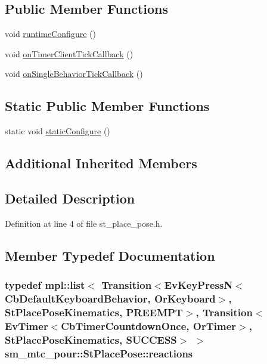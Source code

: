 \subsection*{Public Member Functions}
\begin{DoxyCompactItemize}
\item 
void \hyperlink{structsm__mtc__pour_1_1StPlacePose_a078643c61a6b7b4db7cf33a2aae4e0fa}{runtime\+Configure} ()
\item 
void \hyperlink{structsm__mtc__pour_1_1StPlacePose_a0ee8b552912408e648c7aba13c02cc94}{on\+Timer\+Client\+Tick\+Callback} ()
\item 
void \hyperlink{structsm__mtc__pour_1_1StPlacePose_a729c53fe332ca80613dc13659ba066be}{on\+Single\+Behavior\+Tick\+Callback} ()
\end{DoxyCompactItemize}
\subsection*{Static Public Member Functions}
\begin{DoxyCompactItemize}
\item 
static void \hyperlink{structsm__mtc__pour_1_1StPlacePose_a1973e99e9cd8b7d79e1a0f2800640aa5}{static\+Configure} ()
\end{DoxyCompactItemize}
\subsection*{Additional Inherited Members}


\subsection{Detailed Description}


Definition at line 4 of file st\+\_\+place\+\_\+pose.\+h.



\subsection{Member Typedef Documentation}
\subsubsection[{\texorpdfstring{reactions}{reactions}}]{\setlength{\rightskip}{0pt plus 5cm}typedef mpl\+::list$<$ Transition$<$Ev\+Key\+PressN$<$Cb\+Default\+Keyboard\+Behavior, {\bf Or\+Keyboard}$>$, {\bf St\+Place\+Pose\+Kinematics}, {\bf P\+R\+E\+E\+M\+PT}$>$, Transition$<$Ev\+Timer$<$Cb\+Timer\+Countdown\+Once, {\bf Or\+Timer}$>$, {\bf St\+Place\+Pose\+Kinematics}, {\bf S\+U\+C\+C\+E\+SS}$>$ $>$ {\bf sm\+\_\+mtc\+\_\+pour\+::\+St\+Place\+Pose\+::reactions}}\hypertarget{structsm__mtc__pour_1_1StPlacePose_aded6568c27639dbb76bb94ad3b964237}{}\label{structsm__mtc__pour_1_1StPlacePose_aded6568c27639dbb76bb94ad3b964237}


